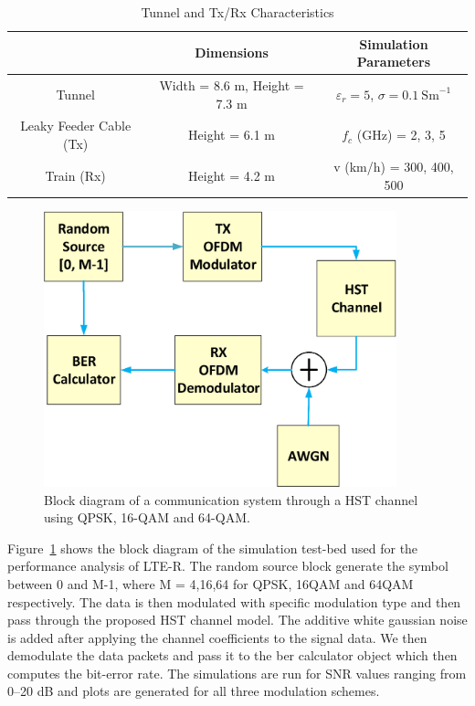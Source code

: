 \begin{table}[t!]
\centering
\caption{Tunnel and Tx/Rx Characteristics}
\begin{tabular}{c  c  c }
   & Dimensions & Simulation Parameters\\\hline
Tunnel & Width = 8.6 m, Height = 7.3 m & $\varepsilon_r = 5$, $\sigma = 0.1~\textrm{Sm}^{-1}$\\\hline
Leaky Feeder Cable (Tx) & Height = 6.1 m & $f_c$ (GHz) = 2, 3, 5\\\hline
Train (Rx) & Height = 4.2 m &  v (km/h) = 300, 400, 500\\
\hline
\end{tabular}
\label{tablelter}
\end{table}

\begin{figure}[!ht]
\label{finalblock}
\centering
\includegraphics[width=\textwidth,height=8cm,keepaspectratio]{images/Gill/lte_figs/finalblock.eps} 
\caption{Block diagram of a communication system through a HST channel using QPSK, 16-QAM and 64-QAM.}
\end{figure}

Figure~\ref{finalblock} shows the block diagram of the simulation test-bed used for the performance analysis of LTE-R. The random source block generate the symbol between 0 and M-1, where M = 4,16,64 for QPSK, 16QAM and 64QAM respectively. The data is then modulated with specific modulation type and then pass through the proposed HST channel model. The additive white gaussian noise is added after applying the channel coefficients to the signal data. We then demodulate the data packets and pass it to the ber calculator object which then computes the bit-error rate. The simulations are run for SNR values ranging from 0--20 dB and plots are generated for all three modulation schemes.

